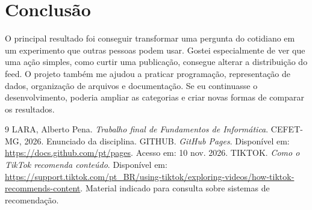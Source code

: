 \documentclass[11pt,a4paper]{article}
\begin{document}
\section{Conclusão}
O principal resultado foi conseguir transformar uma pergunta do cotidiano em um experimento que outras pessoas podem usar. Gostei especialmente de ver que uma ação simples, como curtir uma publicação, consegue alterar a distribuição do feed. O projeto também me ajudou a praticar programação, representação de dados, organização de arquivos e documentação. Se eu continuasse o desenvolvimento, poderia ampliar as categorias e criar novas formas de comparar os resultados.

\begin{thebibliography}{9}
 LARA, Alberto Pena. \textit{Trabalho final de Fundamentos de Informática}. CEFET-MG, 2026. Enunciado da disciplina.
 GITHUB. \textit{GitHub Pages}. Disponível em: \url{https://docs.github.com/pt/pages}. Acesso em: 10 nov. 2026.
 TIKTOK. \textit{Como o TikTok recomenda conteúdo}. Disponível em: \url{https://support.tiktok.com/pt_BR/using-tiktok/exploring-videos/how-tiktok-recommends-content}. Material indicado para consulta sobre sistemas de recomendação.
\end{thebibliography}
\end{document}
